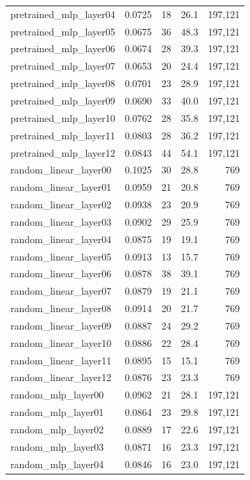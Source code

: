 \documentclass[11pt,a4paper]{article}
\begin{document}
\begin{table}[H]
\begin{tabular}{lrrrr}
pretrained\_mlp\_layer04 & 0.0725 & 18 & 26.1 & 197,121 \\
pretrained\_mlp\_layer05 & 0.0675 & 36 & 48.3 & 197,121 \\
pretrained\_mlp\_layer06 & 0.0674 & 28 & 39.3 & 197,121 \\
pretrained\_mlp\_layer07 & 0.0653 & 20 & 24.4 & 197,121 \\
pretrained\_mlp\_layer08 & 0.0701 & 23 & 28.9 & 197,121 \\
pretrained\_mlp\_layer09 & 0.0690 & 33 & 40.0 & 197,121 \\
pretrained\_mlp\_layer10 & 0.0762 & 28 & 35.8 & 197,121 \\
pretrained\_mlp\_layer11 & 0.0803 & 28 & 36.2 & 197,121 \\
pretrained\_mlp\_layer12 & 0.0843 & 44 & 54.1 & 197,121 \\
\midrule
random\_linear\_layer00 & 0.1025 & 30 & 28.8 & 769 \\
random\_linear\_layer01 & 0.0959 & 21 & 20.8 & 769 \\
random\_linear\_layer02 & 0.0938 & 23 & 20.9 & 769 \\
random\_linear\_layer03 & 0.0902 & 29 & 25.9 & 769 \\
random\_linear\_layer04 & 0.0875 & 19 & 19.1 & 769 \\
random\_linear\_layer05 & 0.0913 & 13 & 15.7 & 769 \\
random\_linear\_layer06 & 0.0878 & 38 & 39.1 & 769 \\
random\_linear\_layer07 & 0.0879 & 19 & 21.1 & 769 \\
random\_linear\_layer08 & 0.0914 & 20 & 21.7 & 769 \\
random\_linear\_layer09 & 0.0887 & 24 & 29.2 & 769 \\
random\_linear\_layer10 & 0.0886 & 22 & 28.4 & 769 \\
random\_linear\_layer11 & 0.0895 & 15 & 15.1 & 769 \\
random\_linear\_layer12 & 0.0876 & 23 & 23.3 & 769 \\
\midrule
random\_mlp\_layer00 & 0.0962 & 21 & 28.1 & 197,121 \\
random\_mlp\_layer01 & 0.0864 & 23 & 29.8 & 197,121 \\
random\_mlp\_layer02 & 0.0889 & 17 & 22.6 & 197,121 \\
random\_mlp\_layer03 & 0.0871 & 16 & 23.3 & 197,121 \\
random\_mlp\_layer04 & 0.0846 & 16 & 23.0 & 197,121 \\

\end{tabular}
\end{table}
\end{document}
